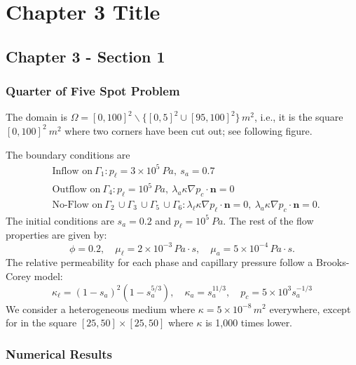 \chapter[Chapter 3-Convergence Results]{Chapter 3 Title}
\label{sec:chapter3}
\setcounter{secnumdepth}{3}
%
%
\minitoc
%

	\section{Chapter 3 - Section 1}
\label{sec:chapter_3_sec_1}


\subsection{Quarter of Five Spot Problem}
The domain is $\Omega = [0,100]^2 \backslash  \{[0,5]^2 \cup [95,100]^2\} \, m^2$, i.e., it is the square $[0,100]^2 \ m^2$ where two corners have been cut out; see following figure.

The boundary conditions are
\begin{align}
	&\text{Inflow on} \ \Gamma_1 : p_\ell = 3 \times 10^5 \ Pa, \ s_a = 0.7 \nonumber  \\
	&\text{Outflow on} \ \Gamma_4 : p_\ell = 10^5 \, Pa, \ \lambda_a \kappa \nabla p_c \cdot \textbf{n} = 0   \nonumber \\
	& \text{No-Flow on} \ \Gamma_2 \, \cup \Gamma_3 \, \cup \Gamma_5 \, \cup \Gamma_6 :  \lambda_\ell \kappa \nabla p_\ell \cdot \textbf{n} = 0, \ \lambda_a \kappa \nabla p_c \cdot \textbf{n} = 0. \nonumber
\end{align}
The initial conditions are $s_a = 0.2$ and $p_\ell = 10^5 \ Pa$. The rest of the flow properties are given by:
\[
	\phi = 0.2, \quad \mu_\ell = 2 \times 10^{-3} \, Pa \cdot s, \quad \mu_a = 5 \times 10^{-4} \, Pa \cdot s.
\]
The relative permeability for each phase and capillary pressure follow a Brooks-Corey model:
\[ 
\kappa_\ell = (1-s_a)^2(1-s_a^{5/3}), \quad \kappa_a = s_a^{11/3}, \quad p_c = 5 \times 10^3 s_a^{-1/3}
\]
We consider a heterogeneous medium where $\kappa = 5 \times 10^{-8} \, m^2$ everywhere, except for in the square $[25, 50] \times [25,50]$ where $\kappa$ is 1,000 times lower.





\subsection{Numerical Results}


